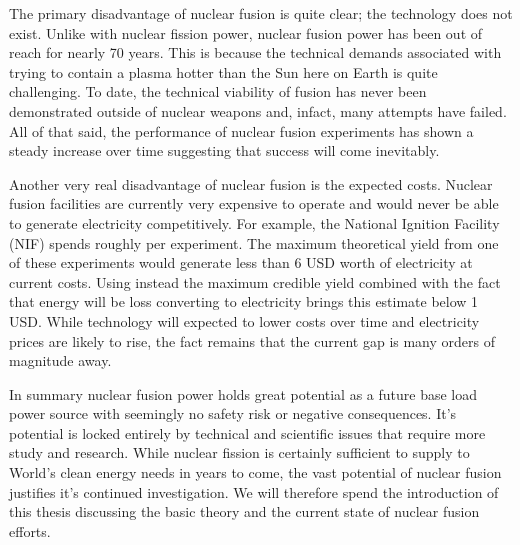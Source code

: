 		The primary disadvantage of nuclear fusion is quite clear; the technology does not exist. Unlike with nuclear fission power, nuclear fusion power has been out of reach for nearly 70 years. \cite{bibid} This is because the technical demands associated with trying to contain a plasma hotter than the Sun here on Earth is quite challenging. To date, the technical viability of fusion has never been demonstrated outside of nuclear weapons and, infact, many attempts have failed. \cite{bibid} All of that said, the performance of nuclear fusion experiments has shown a steady increase over time suggesting that success will come inevitably. \cite{bibid}
		
		Another very real disadvantage of nuclear fusion is the expected costs. Nuclear fusion facilities are currently very expensive to operate and would never be able to generate electricity competitively. \cite{bibid} For example, the National Ignition Facility (NIF) spends roughly  per experiment. \cite{bibid} The maximum theoretical yield from one of these experiments would generate less than 6 USD worth of electricity at current costs. \cite{bibid} Using instead the maximum credible yield combined with the fact that energy will be loss converting to electricity brings this estimate below 1 USD. \cite{bibid} While technology will expected to lower costs over time and electricity prices are likely to rise, the fact remains that the current gap is many orders of magnitude away.
		
		In summary nuclear fusion power holds great potential as a future base load power source with seemingly no safety risk or negative consequences. It's potential is locked entirely by technical and scientific issues that require more study and research. While nuclear fission is certainly sufficient to supply to World's clean energy needs in years to come, the vast potential of nuclear fusion justifies it's continued investigation. We will therefore spend the introduction of this thesis discussing the basic theory and the current state of nuclear fusion efforts. 